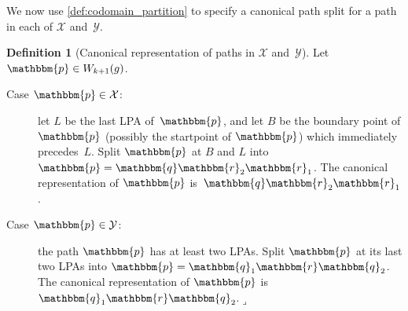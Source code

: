 \documentclass[11pt]{article}
\newcommand{\lrcornerqed}[0]{}
\renewcommand{\lrcornerqed}[0]{\hfill $\lrcorner$} %
\theoremstyle{definition} %
\newtheorem{definition}[thm]{Definition}
\numberwithin{equation}{section}
\begin{document}
We now use \cref{def:codomain_partition} to specify a canonical path split for a path in each of $\mathcal X$ and~$\mathcal Y$.

\begin{definition}[Canonical representation of paths in $\mathcal X$ and~$\mathcal Y$]
\label{def:codomain_split}
    Let $\mathbbm{p} \in W_{k+1}(g)$.
    \begin{description}

        \item[Case $\mathbbm{p} \in \mathcal{X}$:]
            let $L$ be the last LPA of~$\mathbbm{p}$, and let $B$ be the boundary point of $\mathbbm{p}$ (possibly the startpoint of $\mathbbm{p}$) which immediately precedes~$L$. 
            Split $\mathbbm{p}$ at $B$ and $L$ into $\mathbbm{p} = \mathbbm{q} \mathbbm{r}_2 \mathbbm{r}_1$. 
            The canonical representation of $\mathbbm{p}$ is~$\mathbbm{q} \mathbbm{r}_2 \mathbbm{r}_1$.

        \item[Case $\mathbbm{p} \in \mathcal{Y}$:]
            the path $\mathbbm{p}$ has at least two LPAs. 
            Split $\mathbbm{p}$ at its 
            last two LPAs
            into $\mathbbm{p} = \mathbbm{q}_1 \mathbbm{r} \mathbbm{q}_2$. 
            The canonical representation of $\mathbbm{p}$ is~$\mathbbm{q}_1 \mathbbm{r} \mathbbm{q}_2$.\lrcornerqed
    \end{description}
\end{definition}
\end{document}
